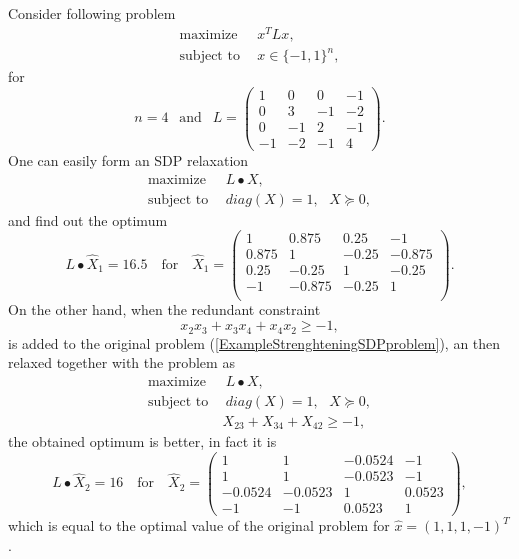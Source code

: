 \documentclass[12pt]{book}
\theoremstyle{definition}
\begin{document}
\ex %
\label{ExampleStrenghteningSDP}
Consider following problem
\begin{equation}
\begin{array}{ll}
\label{ExampleStrenghteningSDPproblem}
\mbox{maximize}&\ \ x^TLx, \\
\mbox{subject to}&\ \ x\in\{-1,1\}^n,
\end{array}
\end{equation}
for $$n = 4 \ \ \mbox{ and } \ \
L = \left(\begin{array}{rrrr}
     1  &   0  &   0  &  -1\\
     0  &   3  &  -1  &  -2\\
     0  &  -1  &   2  &  -1\\
    -1  &  -2  &  -1  &   4
\end{array}\right).
$$
One can easily form an SDP relaxation 
\begin{equation}
\begin{array}{ll}
\mbox{maximize}&\ \ L\bullet X, \\
\mbox{subject to}&\ \ diag(X) = 1, \ \ \ X\succeq 0,
\end{array}
\end{equation}
and find out the optimum
$$ L\bullet\hat{X}_1 = 16.5 \ \ \ \mbox{ for } \ \ \ \hat{X}_1 = \left(\begin{array}{rrrr}
    1  &  0.875 &   0.25 &  -1\\
    0.875  &  1 &  -0.25 &  -0.875\\
    0.25  & -0.25 &   1 &  -0.25\\
   -1  & -0.875 &  -0.25 &   1\\
\end{array}\right) .
$$
On the other hand, when the redundant constraint
$$x_2x_3 + x_3x_4 + x_4x_2 \geq -1,$$
is added to the original problem (\ref{ExampleStrenghteningSDPproblem}), an then relaxed together with the problem as 
\begin{equation}
\begin{array}{ll}
\mbox{maximize}&\ \ L\bullet X, \\
\mbox{subject to}&\ \ diag(X) = 1, \ \ \ X\succeq 0,\\
				& \ X_{23} + X_{34} + X_{42} \geq -1,
\end{array}
\end{equation}
the obtained optimum is better, in fact it is 
$$ L\bullet\hat{X}_2 = 16 \ \ \ \mbox{ for } \ \ \ \hat{X}_2 = \left(\begin{array}{rrrr}
	1		&  1	   & -0.0524 &  -1		\\
    1		&  1	   & -0.0523 &  -1		\\
   -0.0524  & -0.0523  &  1	 	 &   0.0523	\\
   -1		& -1	   &  0.0523 &   1		
\end{array}\right) ,
$$
which is equal to the optimal value of the original problem for $\hat{x} = (1,1,1,-1)^T$.
\end{document}
